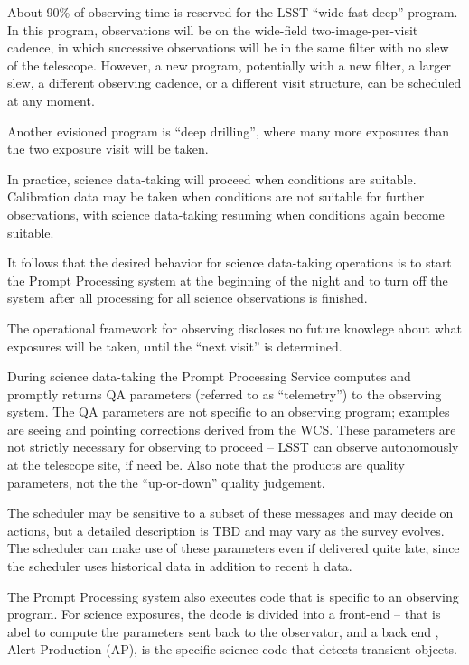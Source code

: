 About 90\% of observing time is reserved for the LSST “wide-fast-deep”
program. In this program, observations will be on the wide-field
two-image-per-visit cadence, in which successive observations will be
in the same filter with no slew of the telescope. However, a new
program, potentially with a new filter, a larger slew, a different
observing cadence, or a different visit structure, can be scheduled at
any moment.

Another evisioned program is ``deep drilling'', where many more exposures
than the two exposure visit will be taken.

In practice, science data-taking will proceed when conditions are
suitable. Calibration data may be taken when conditions are not
suitable for further observations, with science data-taking resuming
when conditions again become suitable.

It follows that the desired behavior for science data-taking
operations is to start the Prompt Processing system at the beginning
of the night and to turn off the system after all processing for all
science observations is finished.  

The operational framework for observing discloses no future knowlege
about what exposures will be taken, until the “next visit” is
determined.

During science data-taking the Prompt Processing Service computes and
promptly returns QA parameters (referred to as “telemetry”) to the
observing system. The QA parameters are not specific to an observing
program; examples are seeing and pointing corrections derived from the
WCS. These parameters are not strictly necessary for observing to
proceed -- LSST can observe autonomously at the telescope site, if
need be. Also note that the products are quality parameters, not the
the “up-or-down” quality judgement.

The scheduler may be sensitive to a subset of these messages and may
decide on actions, but a detailed description is TBD and may vary as
the survey evolves. The scheduler can make use of these parameters even
if delivered quite late, since the scheduler uses historical data
in addition to recent h data.

The Prompt Processing system also executes code that is specific to an
observing program. For science exposures, the dcode is divided into
a front-end -- that is abel to compute the parameters sent back  to the
observator, and a back end , Alert Production (AP), is the specific
science code that detects transient objects.

